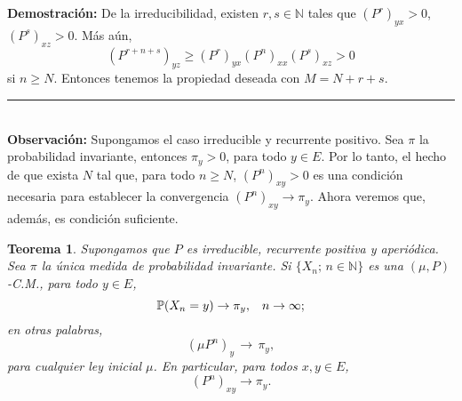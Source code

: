 \documentclass[a4paper]{article}
\newcommand{\prob}{\mathbb{P}}
\newtheorem{teorema}{Teorema}
\numberwithin{equation}{subsection}
\def\N{\mathbb N}
\begin{document}
\textbf{Demostración: }De la irreducibilidad, existen $r,s\in \N$ tales que $(P^r)_{yx} >0$, $(P^s)_{xz}>0$. Más aún,
\[(P^{r+n+s})_{yz}\geq (P^r)_{yx}(P^n)_{xx}(P^s)_{xz}>0\]
si $n\geq N$. Entonces tenemos la propiedad deseada con $M=N+r+s$.\\
\rule{0.7em}{0.7em}\\ \newline
\textbf{Observación: }Supongamos el caso irreducible y recurrente positivo. Sea $\pi$ la probabilidad invariante, entonces $\pi_y>0$, para todo $y\in E$. Por lo tanto, el hecho de que exista $N$ tal que, para todo $n\geq N$, $(P^n)_{xy}>0$ es una condición necesaria para establecer la convergencia $(P^n)_{xy}\rightarrow \pi_y$. Ahora veremos que, además, es condición suficiente.\\ \newline
\begin{teorema}
Supongamos que $P$ es irreducible, recurrente positiva y aperiódica. Sea $\pi$ la única medida de probabilidad invariante. Si $\{X_n;\,n\in\N\}$ es una $(\mu,P)$-C.M., para todo $y\in E$,
\[\prob(X_n = y)\rightarrow \pi_y,\hspace{0.3cm}n\rightarrow \infty;\]
en otras palabras, 
\[(\mu P^n)_y \, \rightarrow\,\pi_y,\] 
para cualquier ley inicial $\mu$. En particular, para todos $x,y\in E$,
\[(P^n)_{xy}\rightarrow \pi_y.\]
\end{teorema}
\end{document}
